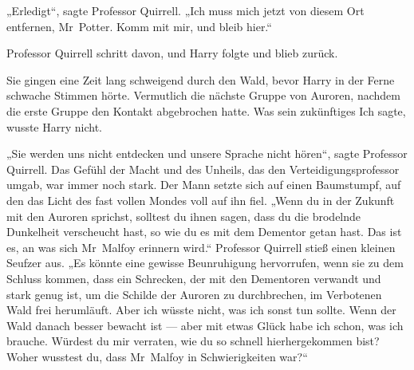 „Erledigt“, sagte Professor Quirrell.
„Ich muss mich jetzt von diesem Ort entfernen, Mr~Potter. Komm mit mir, und bleib hier.“

Professor Quirrell schritt davon, und Harry folgte und blieb zurück.

Sie gingen eine Zeit lang schweigend durch den Wald, bevor Harry in der Ferne schwache Stimmen hörte. Vermutlich die nächste Gruppe von Auroren, nachdem die erste Gruppe den Kontakt abgebrochen hatte. Was sein zukünftiges Ich sagte, wusste Harry nicht.

„Sie werden uns nicht entdecken und unsere Sprache nicht hören“, sagte Professor Quirrell. Das Gefühl der Macht und des Unheils, das den Verteidigungsprofessor umgab, war immer noch stark. Der Mann setzte sich auf einen Baumstumpf, auf den das Licht des fast vollen Mondes voll auf ihn fiel.
„Wenn du in der Zukunft mit den Auroren sprichst, solltest du ihnen sagen, dass du die brodelnde Dunkelheit verscheucht hast, so wie du es mit dem Dementor getan hast. Das ist es, an was sich Mr~Malfoy erinnern wird.“ Professor Quirrell stieß einen kleinen Seufzer aus.
„Es könnte eine gewisse Beunruhigung hervorrufen, wenn sie zu dem Schluss kommen, dass ein Schrecken, der mit den Dementoren verwandt und stark genug ist, um die Schilde der Auroren zu durchbrechen, im Verbotenen Wald frei herumläuft. Aber ich wüsste nicht, was ich sonst tun sollte. Wenn der Wald danach besser bewacht ist — aber mit etwas Glück habe ich schon, was ich brauche. Würdest du mir verraten, wie du so schnell hierhergekommen bist? Woher wusstest du, dass Mr~Malfoy in Schwierigkeiten war?“

